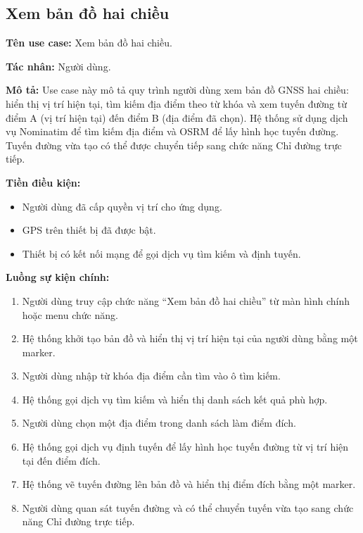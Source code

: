 \documentclass[../DoAn.tex]{subfiles}
\begin{document}

\subsection{Xem bản đồ hai chiều}
\label{subsection:2.3.bando}
\textbf{Tên use case:} Xem bản đồ hai chiều.

\textbf{Tác nhân:} Người dùng.

\textbf{Mô tả:} Use case này mô tả quy trình người dùng xem bản đồ GNSS hai chiều: hiển thị vị trí hiện tại, tìm kiếm địa điểm theo từ khóa và xem tuyến đường từ điểm A (vị trí hiện tại) đến điểm B (địa điểm đã chọn). Hệ thống sử dụng dịch vụ Nominatim để tìm kiếm địa điểm và OSRM để lấy hình học tuyến đường. Tuyến đường vừa tạo có thể được chuyển tiếp sang chức năng Chỉ đường trực tiếp.

\textbf{Tiền điều kiện:}
\begin{itemize}
    \item Người dùng đã cấp quyền vị trí cho ứng dụng.
    \item GPS trên thiết bị đã được bật.
    \item Thiết bị có kết nối mạng để gọi dịch vụ tìm kiếm và định tuyến.
\end{itemize}

\textbf{Luồng sự kiện chính:}
\begin{enumerate}
    \item Người dùng truy cập chức năng ``Xem bản đồ hai chiều'' từ màn hình chính hoặc menu chức năng.
    \item Hệ thống khởi tạo bản đồ và hiển thị vị trí hiện tại của người dùng bằng một marker.
    \item Người dùng nhập từ khóa địa điểm cần tìm vào ô tìm kiếm.
    \item Hệ thống gọi dịch vụ tìm kiếm và hiển thị danh sách kết quả phù hợp.
    \item Người dùng chọn một địa điểm trong danh sách làm điểm đích.
    \item Hệ thống gọi dịch vụ định tuyến để lấy hình học tuyến đường từ vị trí hiện tại đến điểm đích.
    \item Hệ thống vẽ tuyến đường lên bản đồ và hiển thị điểm đích bằng một marker.
    \item Người dùng quan sát tuyến đường và có thể chuyển tuyến vừa tạo sang chức năng Chỉ đường trực tiếp.
\end{enumerate}
\end{document}
